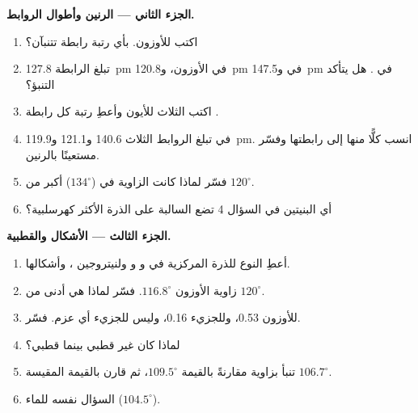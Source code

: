 \begin{problem}
\medskip
\noindent\textbf{الجزء الثاني --- الرنين وأطوال الروابط.}
\begin{enumerate}[resume]
  \item اكتب  للأوزون. بأي رتبة رابطة
        تتنبآن؟
  \item تبلغ الرابطة  \qty{127.8}{pm} في الأوزون،
        و\qty{120.8}{pm} في  و\qty{147.5}{pm} في . هل
        يتأكد التنبؤ؟
  \item اكتب  الثلاث للأيون  وأعطِ
        رتبة كل رابطة .
  \item في  تبلغ الروابط  الثلاث 140.6 و121.1
        و\qty{119.9}{pm}. انسب كلًّا منها إلى رابطتها وفسّر مستعينًا بالرنين.
  \item فسّر لماذا كانت الزاوية  في  ($134^\circ$)
        أكبر من $120^\circ$.
  \item أي البنيتين في السؤال 4 تضع 
        السالبة على الذرة الأكثر كهرسلبية؟
\end{enumerate}

\medskip
\noindent\textbf{الجزء الثالث --- الأشكال والقطبية.}
\begin{enumerate}[resume]
  \item أعطِ النوع  للذرة المركزية في 
        و و ولنيتروجين ، وأشكالها.
  \item زاوية الأوزون $116.8^\circ$. فسّر لماذا هي أدنى من
        $120^\circ$.
  \item للأوزون  \qty{0.53}{\debye}، وللجزيء 
        \qty{0.16}{\debye}، وليس للجزيء  أي عزم. فسّر.
  \item لماذا كان  غير قطبي بينما  قطبي؟
  \item تنبأ بزاوية  مقارنةً بالقيمة $109.5^\circ$، ثم
        قارن بالقيمة المقيسة $106.7^\circ$.
  \item السؤال نفسه للماء ($104.5^\circ$).
\end{enumerate}


\end{problem}
